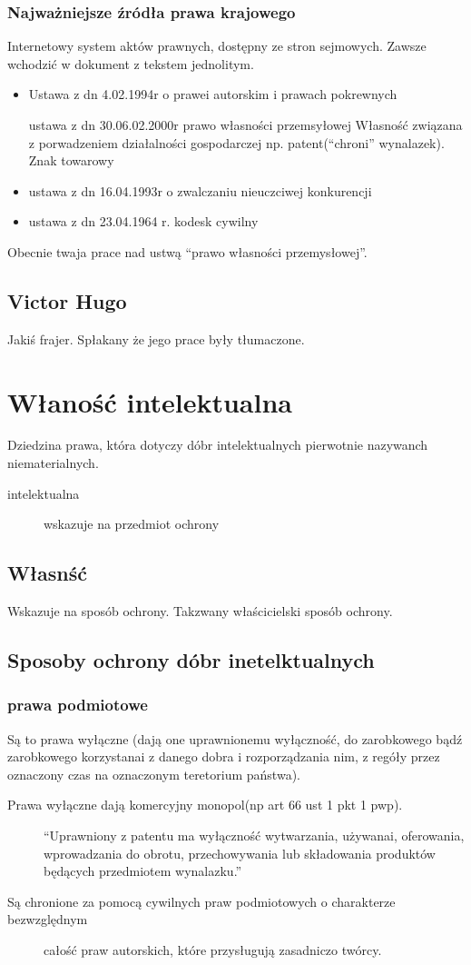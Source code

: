 \documentclass[11pt]{article}
\begin{document}
\subsubsection{Najważniejsze źródła prawa krajowego}
\label{sec:org56963de}
Internetowy system aktów prawnych, dostępny ze stron sejmowych. Zawsze wchodzić w dokument z tekstem jednolitym.
\begin{itemize}
\item Ustawa z dn 4.02.1994r o prawei autorskim i prawach pokrewnych
\item[{ustawa z dn 30.06.02.2000r prawo własności przemsyłowej}] Własność związana z porwadzeniem działalności gospodarczej np. patent(``chroni'' wynalazek). Znak towarowy
\item ustawa z dn 16.04.1993r o zwalczaniu nieuczciwej konkurencji
\item ustawa z dn 23.04.1964 r. kodesk cywilny
\end{itemize}
Obecnie twaja prace nad ustwą ``prawo własności przemysłowej''.
\subsection{Victor Hugo}
\label{sec:org6d02123}
Jakiś frajer. Spłakany że jego prace były tłumaczone.
\section{Właność intelektualna}
\label{sec:org9220b5f}
Dziedzina prawa, która dotyczy dóbr intelektualnych pierwotnie nazywanch niematerialnych.
\begin{description}
\item[{intelektualna}] wskazuje na przedmiot ochrony
\end{description}
\subsection{Własnść}
\label{sec:orgd78efbe}
Wskazuje na sposób ochrony.
Takzwany właścicielski sposób ochrony.
\subsection{Sposoby ochrony dóbr inetelktualnych}
\label{sec:org67c3676}
\subsubsection{prawa podmiotowe}
\label{sec:orgdefee64}
Są to prawa wyłączne (dają one uprawnionemu wyłączność, do zarobkowego bądź zarobkowego korzystanai z danego dobra i rozporządzania nim, z regóły przez oznaczony czas na oznaczonym teretorium państwa).
\begin{description}
\item[{Prawa wyłączne dają komercyjny monopol(np art 66 ust 1 pkt 1 pwp).}] ``Uprawniony z patentu ma wyłączność wytwarzania, używanai, oferowania, wprowadzania do obrotu, przechowywania lub składowania produktów będących przedmiotem wynalazku.''
\item[{Są chronione za pomocą cywilnych praw podmiotowych o charakterze bezwzględnym}] całość praw autorskich, które przysługują zasadniczo twórcy.
\end{description}
\end{document}
